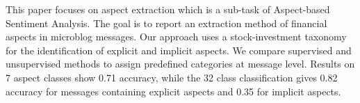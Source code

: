 This paper focuses on aspect extraction which is a sub-task of Aspect-based Sentiment Analysis. The goal is to report an extraction method of financial aspects in microblog messages. Our approach uses a stock-investment taxonomy for the identification of explicit and implicit aspects. We compare supervised and unsupervised methods to assign predefined categories at message level. Results on 7 aspect classes show 0.71 accuracy, while the 32 class classification gives 0.82 accuracy for messages containing explicit aspects and 0.35 for implicit aspects.
